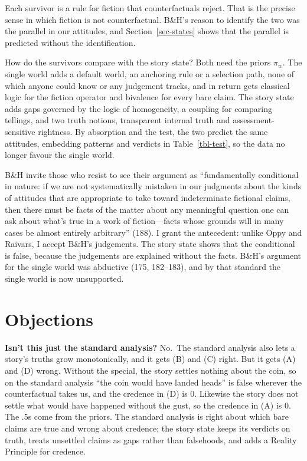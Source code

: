 \documentclass[
  11pt,
  letterpaper,
  DIV=11,
  numbers=noendperiod,
  twoside]{scrartcl}
\newcounter{none} %
\begin{document}
Each survivor is a rule for fiction that counterfactuals reject. That is
the precise sense in which fiction is not counterfactual. B\&H's reason
to identify the two was the parallel in our attitudes, and
Section~\ref{sec-states} shows that the parallel is predicted without
the identification.

How do the survivors compare with the story state? Both need the priors
\(\pi_w\). The single world adds a default world, an anchoring rule or a
selection path, none of which anyone could know or any judgement tracks,
and in return gets classical logic for the fiction operator and
bivalence for every bare claim. The story state adds gaps governed by
the logic of homogeneity, a coupling for comparing tellings, and two
truth notions, transparent internal truth and assessment-sensitive
rightness. By absorption and the test, the two predict the same
attitudes, embedding patterns and verdicts in Table~\ref{tbl-test}, so
the data no longer favour the single world.

B\&H invite those who resist to see their argument as ``fundamentally
conditional in nature: if we are not systematically mistaken in our
judgments about the kinds of attitudes that are appropriate to take
toward indeterminate fictional claims, then there must be facts of the
matter about any meaningful question one can ask about what's true in a
work of fiction---facts whose grounds will in many cases be almost
entirely arbitrary'' (188). I grant the antecedent: unlike Oppy and
Raivars, I accept B\&H's judgements. The story state shows that the
conditional is false, because the judgements are explained without the
facts. B\&H's argument for the single world was abductive (175,
182--183), and by that standard the single world is now unsupported.

\section{Objections}\label{sec-objections}

\textbf{Isn't this just the standard analysis?} No.~The standard
analysis also lets a story's truths grow monotonically, and it gets (B)
and (C) right. But it gets (A) and (D) wrong. Without the special, the
story settles nothing about the coin, so on the standard analysis ``the
coin would have landed heads'' is false wherever the counterfactual
takes us, and the credence in (D) is 0. Likewise the story does not
settle what would have happened without the gust, so the credence in (A)
is 0. The .5s come from the priors. The standard analysis is right about
which bare claims are true and wrong about credence; the story state
keeps its verdicts on truth, treats unsettled claims as gaps rather than
falsehoods, and adds a Reality Principle for credence.
\end{document}
